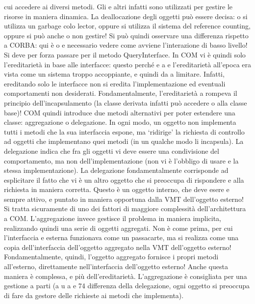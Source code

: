 \documentclass[a4paper,12pt]{article}
\begin{document}
cui accedere ai diversi metodi. Gli
e
altri infatti sono utilizzati per gestire le risorse in maniera dinamica.
La deallocazione degli oggetti può essere decisa: o si utilizza un garbage colo
lector, oppure si utilizza il sistema del reference counting, oppure si può anche
o
non gestire! Si può quindi osservare una differenza rispetto a CORBA: qui è
o
e
necessario vedere come avviene l'interazione di basso livello! Si deve per forza
passare per il metodo QueryInterface.
In COM vi è quindi solo l'ereditarietà in base alle interfacce: questo perché
e
a
e
l'ereditarietà all'epoca era vista come un sistema troppo accoppiante, e quindi da
a
limitare. Infatti, ereditando solo le interfacce non si eredita l'implementazione
ed eventuali comportamenti non desiderati. Fondamentalmente, l'ereditarietà
a
rompeva il principio dell'incapsulamento (la classe derivata infatti può accedere
o
alla classe base)!
COM quindi introduce due metodi alternativi per poter estendere una classe:
aggregazione o delegazione. In ogni modo, un oggetto non implementa tutti i
metodi che la sua interfaccia espone, ma {`}ridirige' la richiesta di controllo ad
oggetti che implementano quei metodi (in un qualche modo li incapsula).
La delegazione indica che fra gli oggetti vi deve essere una condivisione
del comportamento, ma non dell'implementazione (non vi è l'obbligo di usare
e
la stessa implementazione). La delegazione fondamentalmente corrisponde ad
esplicitare il fatto che vi è un altro oggetto che si preoccupa di rispondere
e
alla richiesta in maniera corretta. Questo è un oggetto interno, che deve esere
e
sempre attivo, e puntato in maniera opportuna dalla VMT dell'oggetto esterno!
Si tratta sicuramente di uno dei fattori di maggiore complessità dell'architettura
a
COM.
L'aggregazione invece gestisce il problema in maniera implicita, realizzando
quindi una serie di oggetti aggregati. Non è come prima, per cui l'interfaccia
e
esterna funzionava come un passacarte, ma si realizza come una copia dell'interfaccia dell'oggetto aggregato nella VMT
dell'oggetto esterno! Fondamentalmente, quindi, l'oggetto aggregato fornisce i propri metodi all'esterno, direttamente
nell'interfaccia dell'oggetto esterno! Anche questa maniera è complessa,
e
più dell'ereditarietà. L'aggregazione è consigliata per una gestione a parti (a
u
a
e
74
differenza della delegazione, ogni oggetto si preoccupa di fare da gestore delle
richieste ai metodi che implementa).
\end{document}
